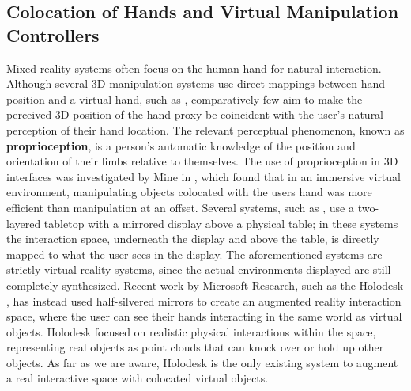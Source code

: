 \documentclass[pageno]{jpaper}
\begin{document}
\subsection{Colocation of Hands and Virtual Manipulation Controllers}
Mixed reality systems often focus on the human hand for natural interaction. 
Although several 3D manipulation systems use direct mappings between hand position and a virtual hand, such as \cite{poupyrev1996go},
comparatively few aim to make the perceived 3D position of the hand proxy be coincident with the user's natural perception of their
hand location. The relevant perceptual phenomenon, known as {\bf proprioception}, is a person's automatic knowledge of the position and orientation of their
limbs relative to themselves. The use of proprioception in 3D interfaces was investigated by Mine in \cite{mine1997exploiting}, which found that
in an immersive virtual environment, manipulating objects colocated with the users hand was more efficient than manipulation at an offset. Several systems,
such as \cite{mulder2002personal, prachyabrued2011dropping}, use a two-layered tabletop with a mirrored display above a physical table; in these systems the interaction space, underneath
the display and above the table, is directly mapped to what the user sees in the display. The aforementioned systems are strictly virtual reality systems, since the actual environments displayed
are still completely synthesized. Recent work by Microsoft Research, such as the Holodesk \cite{holodesk}, has instead used half-silvered mirrors to create an augmented reality
interaction space, where the user can see their hands interacting in the same world as virtual objects. Holodesk focused on realistic physical interactions within the space,
representing real objects as point clouds that can knock over or hold up other objects. As far as we are aware, Holodesk is the only existing system to augment a real
interactive space with colocated virtual objects.
\end{document}
